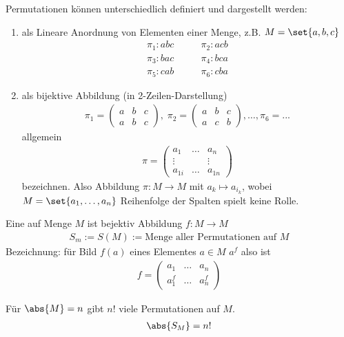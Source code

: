 Permutationen können unterschiedlich definiert und dargestellt werden:
\begin{enumerate}
	\item als Lineare Anordnung von Elementen einer Menge, z.B. $M = \set{a,b,c}$
	\begin{align*}
		\pi_1\colon abc &\qquad \pi_2 \colon acb\\
		\pi_3 \colon bac &\qquad \pi_4 \colon bca\\
		\pi_5 \colon cab &\qquad \pi_6\colon cba
	\end{align*}
	\item als bijektive Abbildung (in 2-Zeilen-Darstellung)
	\begin{align*}
		\pi_1 = \begin{pmatrix}
			a & b & c\\
			a & b & c
		\end{pmatrix},\;
	\pi_2 = \begin{pmatrix}
		a & b & c\\
		a & c & b
	\end{pmatrix}, \dots, \pi_6 = ...
	\end{align*}
	allgemein
	\begin{align*}
		\pi = \begin{pmatrix}
			a_1 & \dots &a_n\\
			\vdots & & \vdots\\
			a_{1i} & \dots & a_{1n}
		\end{pmatrix}
	\end{align*}
	bezeichnen. Also Abbildung $\pi \colon M \to M$ mit $a_k \mapsto a_{i_k}$, wobei $M = \set{a_1, \dots, a_n}$ Reihenfolge der Spalten spielt keine Rolle.
\end{enumerate}
\begin{definition}
	Eine  auf Menge $M$ ist bejektiv Abbildung $f \colon M \to M$
	\begin{align*}
		S_m := S(M) := \text{Menge aller Permutationen auf }M
	\end{align*}
	Bezeichnung: für Bild $f(a)$ eines Elementes $a \in M$ $a^f$ also ist
	\begin{align*}
		f = \begin{pmatrix}
			a_1 & \dots & a_n\\
			a^f_1 &\dots & a^f_n
		\end{pmatrix}
	\end{align*}
\end{definition}
\begin{proposition}
	Für $\abs{M} = n$ gibt $n!$ viele Permutationen auf $M$.
	\begin{align*}
		\abs{S_M} = n!
	\end{align*}
\end{proposition}
